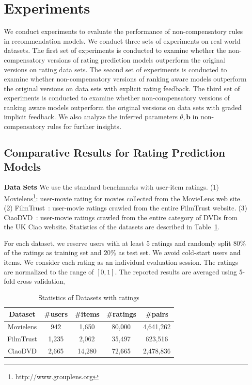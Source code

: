 \documentclass[letterpaper]{article} %
\begin{document}
\section{Experiments}\label{sec:experiment}
We conduct experiments to evaluate the performance of non-compensatory rules in recommendation models. We conduct three sets of experiments on real world datasets. The first set of experiments is conducted to examine whether the non-compensatory versions of rating prediction models outperform the original versions on rating data sets. 
The second set of experiments is conducted to examine whether non-compensatory versions of ranking aware models outperform the original versions on data sets with explicit rating feedback.
The third set of experiments is conducted to examine whether non-compensatory versions of ranking aware models outperform the original versions on data sets with graded implicit feedback. We also analyze the inferred parameters $\theta,\mathbf{b}$ in non-compensatory rules for further insights.

\subsection{Comparative Results for Rating Prediction Models}

\textbf{Data Sets} We use the standard benchmarks with user-item ratings. (1) Movielens\footnote{http://www.grouplens.org}: user-movie rating for movies collected from the MovieLens web site. (2) FilmTrust~\cite{Guo2013Novel}: user-movie ratings crawled from the entire FilmTrust website. (3) CiaoDVD~\cite{Guo2014ETAF}: user-movie ratings crawled from the entire category of DVDs from the UK Ciao website. Statistics of the datasets are described in Table~\ref{tab:datasets}. 

For each dataset, we reserve users with at least $5$ ratings and randomly split $80\%$ of the ratings as training set and $20\%$ as test set. We avoid cold-start users and items. We consider each rating as an individual evaluation session. The ratings are normalized to the range of $[0,1]$. The reported results are averaged using 5-fold cross validation, 

\begin{table}[htp]
\tiny
\caption{Statistics of Datasets with ratings}
\begin{center}
\begin{tabular}{|c|c|c|c|c|}
\hline
Dataset & \#users & \#items & \#ratings & \#pairs \\\hline
Movielens &942 &1,650 &80,000 &4,641,262 \\\hline
FilmTrust &1,235 &2,062 &35,497 &623,516 \\\hline
CiaoDVD &2,665 &14,280 &72,665 &2,478,836 \\\hline
\end{tabular}
\end{center}
\label{tab:datasets}
\end{table}%
 
\end{document}
